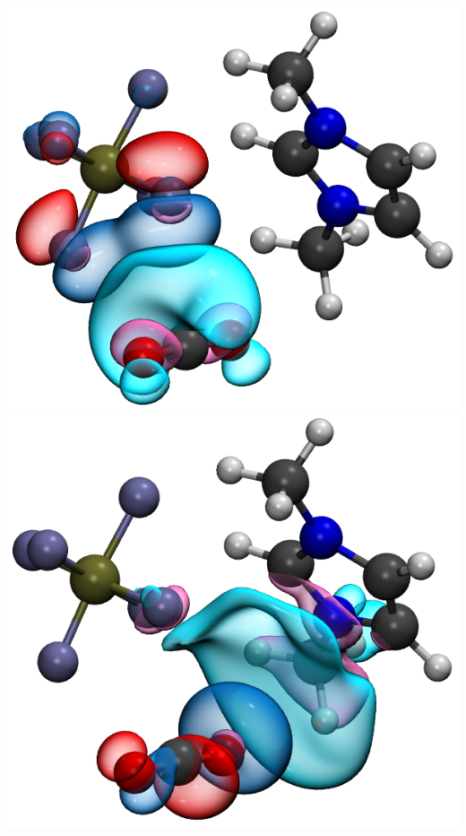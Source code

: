 \documentclass{beamer}
\begin{document}
\begin{frame}
  \centering
  \includegraphics[scale=0.23,natwidth=601,natheight=535]{./figures/PF6.to_CO2.1.png}
  \includegraphics[scale=0.23,natwidth=586,natheight=538]{./figures/PF6.from_CO2.1.png}
\end{frame}
\end{document}
